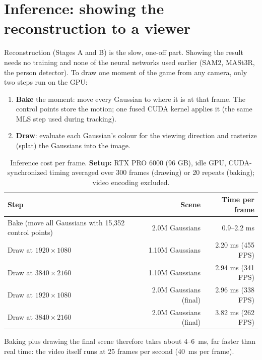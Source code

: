 \documentclass[11pt]{article}
\begin{document}
\section{Inference: showing the reconstruction to a viewer}\label{sec:inference}
Reconstruction (Stages A and B) is the slow, one-off part. Showing the result needs no training and
none of the neural networks used earlier (SAM2, MASt3R, the person detector). To draw one moment of
the game from any camera, only two steps run on the GPU:
\begin{enumerate}
\item \textbf{Bake} the moment: move every Gaussian to where it is at that frame. The control points
store the motion; one fused CUDA kernel applies it (the same MLS step used during tracking).
\item \textbf{Draw}: evaluate each Gaussian's colour for the viewing direction and rasterize (splat)
the Gaussians into the image.
\end{enumerate}

\begin{table}[!htbp]\centering
\caption{Inference cost per frame. \textbf{Setup:} RTX PRO 6000 (96 GB), idle GPU, CUDA-synchronized
timing averaged over 300 frames (drawing) or 20 repeats (baking); video encoding excluded.}\label{tab:inference}
\small\begin{tabular}{lrr}\toprule
Step & Scene & Time per frame \\\midrule
Bake (move all Gaussians with 15{,}352 control points) & 2.0M Gaussians & 0.9--2.2 ms \\
Draw at $1920\times1080$ & 1.10M Gaussians & 2.20 ms (455 FPS) \\
Draw at $3840\times2160$ & 1.10M Gaussians & 2.94 ms (341 FPS) \\
Draw at $1920\times1080$ & 2.0M Gaussians (final) & 2.96 ms (338 FPS) \\
Draw at $3840\times2160$ & 2.0M Gaussians (final) & 3.82 ms (262 FPS) \\\bottomrule
\end{tabular}\end{table}
Baking plus drawing the final scene therefore takes about 4--6~ms, far faster than real time: the video itself
runs at 25 frames per second (40~ms per frame).
\end{document}

